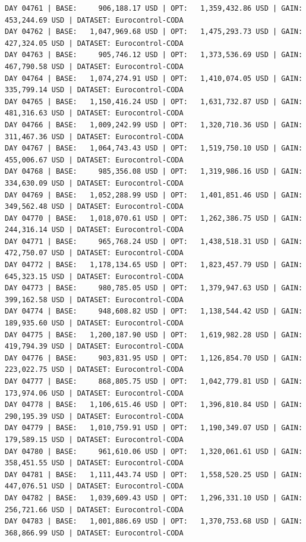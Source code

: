 \documentclass[11pt,a4paper]{article}
\begin{document}
\begin{verbatim}
DAY 04761 | BASE:     906,188.17 USD | OPT:   1,359,432.86 USD | GAIN: 453,244.69 USD | DATASET: Eurocontrol-CODA
DAY 04762 | BASE:   1,047,969.68 USD | OPT:   1,475,293.73 USD | GAIN: 427,324.05 USD | DATASET: Eurocontrol-CODA
DAY 04763 | BASE:     905,746.12 USD | OPT:   1,373,536.69 USD | GAIN: 467,790.58 USD | DATASET: Eurocontrol-CODA
DAY 04764 | BASE:   1,074,274.91 USD | OPT:   1,410,074.05 USD | GAIN: 335,799.14 USD | DATASET: Eurocontrol-CODA
DAY 04765 | BASE:   1,150,416.24 USD | OPT:   1,631,732.87 USD | GAIN: 481,316.63 USD | DATASET: Eurocontrol-CODA
DAY 04766 | BASE:   1,009,242.99 USD | OPT:   1,320,710.36 USD | GAIN: 311,467.36 USD | DATASET: Eurocontrol-CODA
DAY 04767 | BASE:   1,064,743.43 USD | OPT:   1,519,750.10 USD | GAIN: 455,006.67 USD | DATASET: Eurocontrol-CODA
DAY 04768 | BASE:     985,356.08 USD | OPT:   1,319,986.16 USD | GAIN: 334,630.09 USD | DATASET: Eurocontrol-CODA
DAY 04769 | BASE:   1,052,288.99 USD | OPT:   1,401,851.46 USD | GAIN: 349,562.48 USD | DATASET: Eurocontrol-CODA
DAY 04770 | BASE:   1,018,070.61 USD | OPT:   1,262,386.75 USD | GAIN: 244,316.14 USD | DATASET: Eurocontrol-CODA
DAY 04771 | BASE:     965,768.24 USD | OPT:   1,438,518.31 USD | GAIN: 472,750.07 USD | DATASET: Eurocontrol-CODA
DAY 04772 | BASE:   1,178,134.65 USD | OPT:   1,823,457.79 USD | GAIN: 645,323.15 USD | DATASET: Eurocontrol-CODA
DAY 04773 | BASE:     980,785.05 USD | OPT:   1,379,947.63 USD | GAIN: 399,162.58 USD | DATASET: Eurocontrol-CODA
DAY 04774 | BASE:     948,608.82 USD | OPT:   1,138,544.42 USD | GAIN: 189,935.60 USD | DATASET: Eurocontrol-CODA
DAY 04775 | BASE:   1,200,187.90 USD | OPT:   1,619,982.28 USD | GAIN: 419,794.39 USD | DATASET: Eurocontrol-CODA
DAY 04776 | BASE:     903,831.95 USD | OPT:   1,126,854.70 USD | GAIN: 223,022.75 USD | DATASET: Eurocontrol-CODA
DAY 04777 | BASE:     868,805.75 USD | OPT:   1,042,779.81 USD | GAIN: 173,974.06 USD | DATASET: Eurocontrol-CODA
DAY 04778 | BASE:   1,106,615.46 USD | OPT:   1,396,810.84 USD | GAIN: 290,195.39 USD | DATASET: Eurocontrol-CODA
DAY 04779 | BASE:   1,010,759.91 USD | OPT:   1,190,349.07 USD | GAIN: 179,589.15 USD | DATASET: Eurocontrol-CODA
DAY 04780 | BASE:     961,610.06 USD | OPT:   1,320,061.61 USD | GAIN: 358,451.55 USD | DATASET: Eurocontrol-CODA
DAY 04781 | BASE:   1,111,443.74 USD | OPT:   1,558,520.25 USD | GAIN: 447,076.51 USD | DATASET: Eurocontrol-CODA
DAY 04782 | BASE:   1,039,609.43 USD | OPT:   1,296,331.10 USD | GAIN: 256,721.66 USD | DATASET: Eurocontrol-CODA
DAY 04783 | BASE:   1,001,886.69 USD | OPT:   1,370,753.68 USD | GAIN: 368,866.99 USD | DATASET: Eurocontrol-CODA

\end{verbatim}
\end{document}
